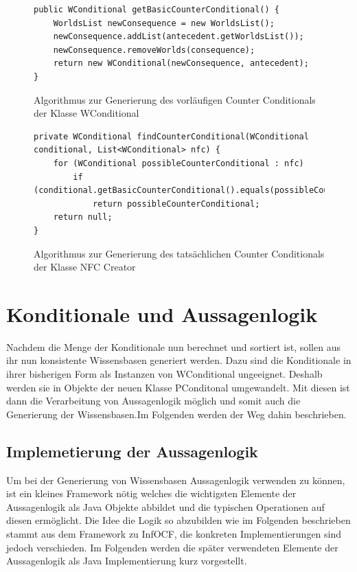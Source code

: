 \documentclass[12pt,a4paper]{article}
\begin{document}
\begin{figure}
\begin{lstlisting}
public WConditional getBasicCounterConditional() {
    WorldsList newConsequence = new WorldsList();
    newConsequence.addList(antecedent.getWorldsList());
    newConsequence.removeWorlds(consequence);
    return new WConditional(newConsequence, antecedent);
}
\end{lstlisting}
\caption{Algorithmus zur Generierung des vorläufigen Counter Conditionals der Klasse WConditional}
\label{code:basic-counter}
\end{figure} 


\begin{figure}
\begin{lstlisting}
private WConditional findCounterConditional(WConditional conditional, List<WConditional> nfc) {
    for (WConditional possibleCounterConditional : nfc)
        if (conditional.getBasicCounterConditional().equals(possibleCounterConditional))
            return possibleCounterConditional;
    return null;
}
\end{lstlisting}
\caption{Algorithmus zur Generierung des tatsächlichen Counter Conditionals der Klasse NFC Creator}
\label{code:real-counter}
\end{figure} 




\section{Konditionale und Aussagenlogik}
Nachdem die Menge der Konditionale nun berechnet und sortiert ist, sollen aus ihr nun konsistente Wissensbasen generiert werden. Dazu sind die Konditionale in ihrer bisherigen Form als Instanzen von WConditional ungeeignet. Deshalb werden sie in Objekte der neuen Klasse PConditonal umgewandelt. Mit diesen ist dann die Verarbeitung von Aussagenlogik möglich und somit auch die Generierung der Wissensbasen.Im Folgenden werden der Weg dahin beschrieben.




\subsection{Implemetierung der Aussagenlogik}
\label{sec:logic}
Um bei der Generierung von Wissensbasen Aussagenlogik verwenden zu können, ist ein kleines Framework nötig welches die wichtigsten Elemente der Aussagenlogik als Java Objekte abbildet und die typischen Operationen auf diesen ermöglicht. Die Idee die Logik so abzubilden wie im Folgenden beschrieben stammt aus dem Framework zu InfOCF, die konkreten Implementierungen sind jedoch verschieden. Im Folgenden werden die später verwendeten Elemente der Aussagenlogik als Java Implementierung kurz vorgestellt. \\
\end{document}
